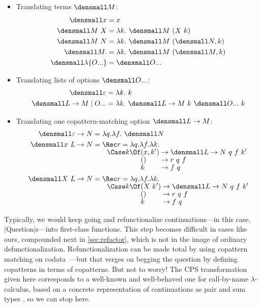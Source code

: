 \documentclass[sigplan,screen]{acmart}
\begin{document}
\begin{itemize}
\item  Translating terms $\den{M}$:
\begin{align*}
  \den{x} &= x
  \\
  \den{M~X} &= \lambda k.~ \den{M} ~ (X ~ k)
  \\
  \den{M~N} &= \lambda k.~ \den{M} ~ (\den{N}, k)
  \\
  \den{M.} &= \lambda k.~ \den{M} ~ (\den{M}, k)
  \\
  \den{\lambda\{\many{O}\}} &= \den{\many{O}}
\end{align*}
\item  Translating lists of options $\den{\many{O}}$:
\begin{align*}
  \den{\varepsilon} &= \lambda k.~ k
  \\
  \den{L \to M \mid \many{O}}
  &=
  \lambda k.~ \den{L \to M} ~ k ~ \den{\many{O}} ~ k
\end{align*}
\item Translating one copattern-matching option $\den{L \to M}$:
\begin{align*}
  \den{\varepsilon \to N} &= \lambda q. \lambda f.~ \den{N}
  \\
  \den{x ~ L \to N} &= \Rec r = \lambda q. \lambda f. \lambda k.
  \\[-1ex]
  &\qquad
  \Case k \Of
  \begin{alignedat}[t]{2}
    &(x, k') &&\to \den{L \to N} ~ q ~ f ~ k'
    \\[-1ex]
    &() &&\to r ~ q ~ f
    \\[-1ex]
    &k &&\to f ~ q
  \end{alignedat}
  \\
  \den{X ~ L \to N} &= \Rec r = \lambda q. \lambda f. \lambda k.
  \\[-1ex]
  &\qquad
  \Case k \Of
  \begin{alignedat}[t]{2}
    &(X ~ k') &&\to \den{L \to N} ~ q ~ f ~ k'
    \\[-1ex]
    &() &&\to r ~ q ~ f
    \\[-1ex]
    &k &&\to f ~ q
  \end{alignedat}
\end{align*}
\end{itemize}

\begin{remark}
  Typically, we would keep going and refunctionalize continuations---in this
  case, \hs|Question|s---into first-class functions.  This step becomes
  difficult in cases like ours, compounded next in \cref{sec:refactor}, which is
  not in the image of ordinary defunctionalization.  Refunctionalization can be
  made total by using copattern matching on
  codata~\cite{RefunctionalizationCopatterns}---but that verges on begging the
  question by defining copatterns in terms of copatterns.  But not to worry!
  The CPS transformation given here corresponds to a well-known and well-behaved
  one for call-by-name $\lambda$-calculus, based on a concrete representation of
  continuations as pair and sum types
  \cite{ContinuationModels,ClassicalLogicContinuationSemantics,CBNSyntacticCPS,AnswerTypePolyEta},
  so we can stop here.
\end{remark}
\end{document}
